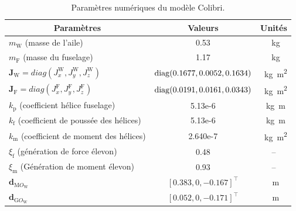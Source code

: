 \begin{table}[ht]
  \centering
    \begin{tabular}{|l|c|c|}
      \hline
      \multicolumn{1}{|c|}{Paramètres} & Valeurs & Unités  \\
      \hline
      $m_{\text{W}}$ (masse de l'aile)  & 0.53& \SI{}{\kilogram} \\
      \hline
      $m_{\text{F}}$ (masse du fuselage)  & 1.17& \SI{}{\kilogram} \\
      \hline
      $\boldsymbol{J}_{\text{W}}=diag(J_{x}^{\text{W}}, J_{y}^{\text{W}}, J_{z}^{\text{W}})$ & \!\! $\operatorname{diag}(0.1677,0.0052,0.1634)$\!\! & \SI{}{\kilogram\square\meter}\\
      \hline
      $\boldsymbol{J}_{\text{F}}=diag(J_{x}^{\text{F}}, J_{y}^{\text{F}}, J_{z}^{\text{F}})$ & \!\! $\operatorname{diag}(0.0191,0.0161,0.0343)$\!\! & \SI{}{\kilogram\square\meter}\\
      \hline
      $k_{\text{p}}$ (coefficient hélice fuselage) & 5.13e-6 & \SI{}{\kilogram\meter}\\
      \hline
      $k_{\text{f}}$ (coefficient de poussée des hélices) & 5.13e-6 & \SI{}{\kilogram\meter}\\
      \hline
      $k_{\text{m}}$ (coefficient de moment des hélices) & 2.640e-7 & \SI{}{\kilogram\square\meter}\\
      \hline
      $\xi_{\text{f}}$ (génération de force élevon) & 0.48 & --\\
      \hline
      $\xi_{\text{m}}$ (Génération de moment élevon) & 0.93 & --\\
      \hline
       $\boldsymbol{d}_{\text{M}O_{\text{W}}}$  & $[0.383,0,-0.167]^\top$ & \SI{}{\meter}\\
      \hline
       $\boldsymbol{d}_{\text{G}O_{\text{W}}}$  & $[0.052,0,-0.171]^\top$ & \SI{}{\meter}\\
      \hline
    \end{tabular}
    \caption{Paramètres numériques du modèle Colibri.}
    \label{tab:pars_colibri}
\end{table}


